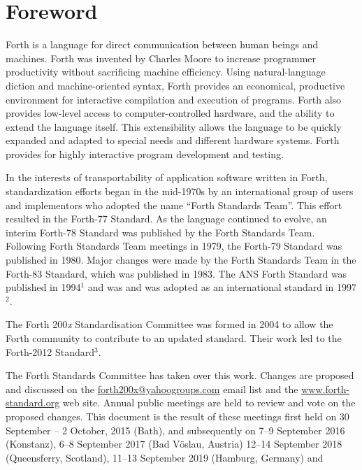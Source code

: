 
\vspace*{-6ex}\chapter*{Foreword}
\label{foreword}

Forth is a language for direct communication between human beings and
machines. Forth was invented by Charles Moore to increase programmer
productivity without sacrificing machine efficiency.
Using natural-language diction and machine-oriented syntax,
Forth provides an economical, productive environment for interactive
compilation and execution of programs. Forth also provides low-level
access to computer-controlled hardware, and the ability to extend the
language itself. This extensibility allows the language to be quickly
expanded and adapted to special needs and different hardware systems.
Forth provides for highly interactive program development and testing.

In the interests of transportability of application software written in
Forth, standardization efforts began in the mid-1970s by an international
group of users and implementors who adopted the name ``Forth Standards Team''.
This effort resulted in the Forth-77 Standard. As the language continued
to evolve, an interim Forth-78 Standard was published by the Forth Standards
Team. Following Forth Standards Team meetings in 1979, the Forth-79 Standard
was published in 1980. Major changes were made by the Forth Standards Team
in the Forth-83 Standard, which was published in 1983.
The ANS Forth Standard was published in 1994$^1$ and was
and was adopted as an international standard in 1997$^2$.




The Forth 200\emph{x} Standardisation Committee was formed in 2004
to allow the Forth community to contribute to an updated standard.
Their work led to the Forth-2012 Standard$^3$.

The Forth Standards Committee has taken over this work.  
Changes are proposed and discussed on the
\href{email:forth200x@yahoogroups.com}{forth200x@yahoogroups.com}
email list and the \href{href://www.forth-standard.org/}{www.forth-standard.org}
web site.
Annual public meetings are held to review and vote on the proposed changes.
This document is the result of these meetings first held on
30 September -- 2 October, 2015 (Bath), and subsequently on
7--9 September 2016 (Konstanz),
6--8 September 2017 (Bad V\"oslau, Austria)
12--14 September 2018 (Queensferry, Scotland),
11--13 September 2019 (Hamburg, Germany)
and 
